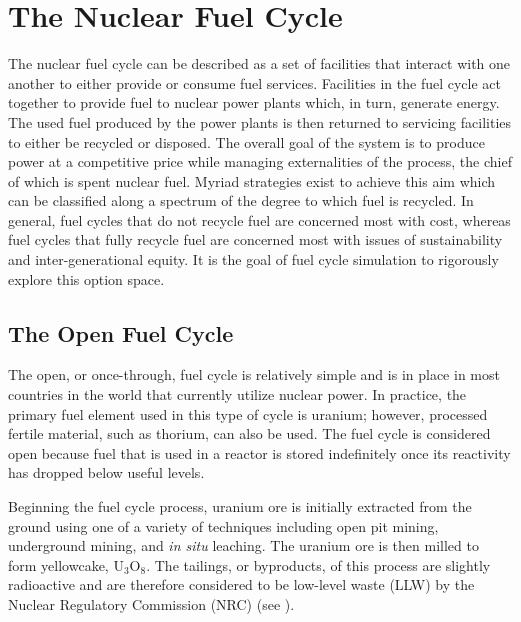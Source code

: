 
\section{The Nuclear Fuel Cycle}

The nuclear fuel cycle can be described as a set of facilities that interact
with one another to either provide or consume fuel services. Facilities in the
fuel cycle act together to provide fuel to nuclear power plants which, in turn,
generate energy. The used fuel produced by the power plants is then returned to
servicing facilities to either be recycled or disposed. The overall goal of the
system is to produce power at a competitive price while managing externalities
of the process, the chief of which is spent nuclear fuel. Myriad strategies
exist to achieve this aim which can be classified along a spectrum of the degree
to which fuel is recycled. In general, fuel cycles that do not recycle fuel are
concerned most with cost, whereas fuel cycles that fully recycle fuel are
concerned most with issues of sustainability and inter-generational equity. It is
the goal of fuel cycle simulation to rigorously explore this option space.

\subsection{The Open Fuel Cycle}

The open, or once-through, fuel cycle is relatively simple and is in place in
most countries in the world that currently utilize nuclear power. In practice,
the primary fuel element used in this type of cycle is uranium; however,
processed fertile material, such as thorium, can also be used. The fuel cycle is
considered open because fuel that is used in a reactor is stored indefinitely
once its reactivity has dropped below useful levels.

Beginning the fuel cycle process, uranium ore is initially extracted from the
ground using one of a variety of techniques including open pit mining,
underground mining, and \textit{in situ} leaching. The uranium ore is then
milled to form yellowcake, $\mathrm{U_3O_8}$. The tailings, or byproducts, of
this process are slightly radioactive and are therefore considered to be
low-level waste (LLW) by the Nuclear Regulatory Commission (NRC)
(see \cite{nrc_10_1985}).

